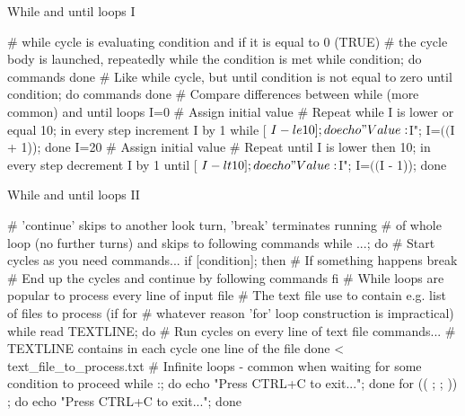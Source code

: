 \documentclass[compress, ucs, xelatex, 11pt, xcolor=svgnames, aspectratio=169,
	hyperref={
		bookmarks=true,
		unicode=true,
		colorlinks=true,
		pdftitle={Linux, command line and MetaCentrum},
		plainpages=false,
		pdfauthor={Vojtech Zeisek},
		pdfsubject={Course about use of Linux command line, writing shell scripts and using MetaCentrum of CESNET},
		pdfcreator={XeLaTeX},
		pdfkeywords={Linux, GNU, BASH, shell, command line, MetaCentrum},
		linkcolor=DarkRed, %
		anchorcolor=DarkBlue, %
		citecolor=Indigo, %
		filecolor=NavyBlue, %
		menucolor=DarkMagenta, %
		urlcolor=DarkBlue, %
		pdftex},
	url={hyphens, lowtilde} %
	]{beamer}
\begin{document}
\begin{frame}[fragile]{While and until loops I}
	\begin{bashcode}
    # while cycle is evaluating condition and if it is equal to 0 (TRUE)
    # the cycle body is launched, repeatedly while the condition is met
    while condition; do
        commands
      done
    # Like while cycle, but until condition is not equal to zero
    until condition; do
      commands
      done
    # Compare differences between while (more common) and until loops
    I=0 # Assign initial value
    # Repeat while I is lower or equal 10; in every step increment I by 1
    while [ $I -le 10 ]; do echo "Value: $I"; I=$(($I + 1)); done
    I=20 # Assign initial value
    # Repeat until I is lower then 10; in every step decrement I by 1
    until [ $I -lt 10 ]; do echo "Value: $I"; I=$(($I - 1)); done
	\end{bashcode}
\end{frame}

\begin{frame}[fragile]{While and until loops II}
	\begin{bashcode}
    # 'continue' skips to another look turn, 'break' terminates running
    # of whole loop (no further turns) and skips to following commands
    while ...; do # Start cycles as you need
      commands...
      if [condition]; then # If something happens
        break # End up the cycles and continue by following commands
        fi
    # While loops are popular to process every line of input file
    # The text file use to contain e.g. list of files to process (if for
    # whatever reason 'for' loop construction is impractical)
    while read TEXTLINE; do # Run cycles on every line of text file
      commands... # TEXTLINE contains in each cycle one line of the file
      done < text_file_to_process.txt
    # Infinite loops - common when waiting for some condition to proceed
    while :; do echo "Press CTRL+C to exit..."; done
    for (( ; ; )) ; do echo "Press CTRL+C to exit..."; done
	\end{bashcode}
\end{frame}

\subsection{}
\end{document}
